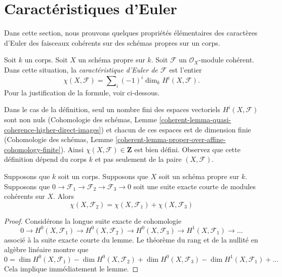 \section{Caractéristiques d'Euler}
\label{section-euler}

\noindent
Dans cette section, nous prouvons quelques propriétés élémentaires des
caractères d'Euler des faisceaux cohérents sur des schémas propres sur un corps.

\begin{definition}
\label{definition-euler-characteristic}
Soit $k$ un corps. Soit $X$ un schéma propre sur $k$. Soit
$\mathcal{F}$ un $\mathcal{O}_X$-module cohérent. Dans cette
situation, la {\it caractéristique d'Euler de $\mathcal{F}$ } est l'entier
$$
\chi(X, \mathcal{F}) = \sum\nolimits_i (-1)^i \dim_k H^i(X, \mathcal{F}).
$$
Pour la justification de la formule, voir ci-dessous.
\end{definition}

\noindent
Dans le cas de la définition, seul un nombre fini des
espaces vectoriels $H^i(X, \mathcal{F})$ sont non nuls
(Cohomologie des schémas, Lemme
\ref{coherent-lemma-quasi-coherence-higher-direct-images})
et chacun de ces espaces est de dimension finie (Cohomologie
des schémas, Lemme
\ref{coherent-lemma-proper-over-affine-cohomology-finite}). Ainsi
$\chi(X, \mathcal{F}) \in \mathbf{Z}$ est bien défini. Observez que cette
définition dépend du corps $k$ et pas seulement de la paire $(X, \mathcal{F})$.

\begin{lemma}
\label{lemma-euler-characteristic-additive}
Supposons que $k$ soit un corps. Supposons que $X$ soit un schéma propre
sur $k$. Supposons que $0 \to \mathcal{F}_1 \to \mathcal{F}_2 \to
\mathcal{F}_3 \to 0$ soit une suite exacte courte de modules cohérents sur $X$. Alors
$$
\chi(X, \mathcal{F}_2) = \chi(X, \mathcal{F}_1) + \chi(X, \mathcal{F}_3)
$$
\end{lemma}

\begin{proof}
Considérons la longue suite exacte de cohomologie
$$
0 \to H^0(X, \mathcal{F}_1) \to H^0(X, \mathcal{F}_2) \to
H^0(X, \mathcal{F}_3) \to H^1(X, \mathcal{F}_1) \to \ldots
$$
associé à la suite exacte courte du lemme. Le théorème
du rang et de la nullité en algèbre linéaire montre que
$$
0 = \dim H^0(X, \mathcal{F}_1) - \dim H^0(X, \mathcal{F}_2)
+ \dim H^0(X, \mathcal{F}_3) - \dim H^1(X, \mathcal{F}_1) + \ldots
$$
Cela implique immédiatement le lemme.
\end{proof}


